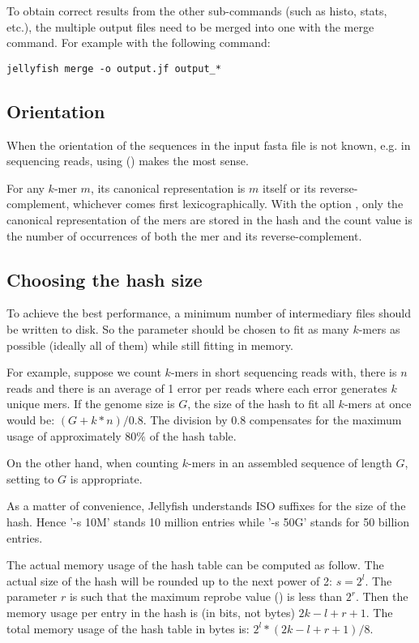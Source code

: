 \documentclass[english]{article}
\newcommand{\ddash}[1]{-\,-#1}
\newcommand{\LOpt}[1]{\Opt{\ddash{#1}}}
\begin{document}
To obtain correct results from the other sub-commands (such as histo,
stats, etc.), the multiple output files need to be merged into one
with the merge command. For example with the following command:

\begin{verbatim}
jellyfish merge -o output.jf output_*
\end{verbatim}

\subsection{Orientation}

When the orientation of the sequences in the input fasta file is not
known, e.g. in sequencing reads, using \LOpt{both-strands} ()
makes the most sense.

For any $k$-mer $m$, its canonical representation is $m$ itself or its
reverse-complement, whichever comes first lexicographically. With the
option , only the canonical representation of the mers are
stored in the hash and the count value is the number of occurrences of
both the mer and its reverse-complement.


\subsection{Choosing the hash size}

To achieve the best performance, a minimum number of intermediary
files should be written to disk. So the parameter  should be
chosen to fit as many $k$-mers as possible (ideally all of them) while
still fitting in memory.

For example, suppose we count $k$-mers in short sequencing reads with,
there is $n$ reads and there is an average of 1 error per reads where
each error generates $k$ unique mers. If the genome size is $G$, the
size of the hash to fit all $k$-mers at once would be: $(G +
k*n)/0.8$. The division by $0.8$ compensates for the maximum usage of
approximately $80\%$ of the hash table.

On the other hand, when counting $k$-mers in an assembled sequence of
length $G$, setting  to $G$ is appropriate.

As a matter of convenience, Jellyfish understands ISO suffixes for the
size of the hash. Hence '-s 10M' stands 10 million entries while '-s
50G' stands for 50 billion entries.

The actual memory usage of the hash table can be computed as
follow. The actual size of the hash will be rounded up to the next
power of 2: $s=2^l$. The parameter $r$ is such that the maximum
reprobe value () is less than $2^r$. Then the memory usage per
entry in the hash is (in bits, not bytes) $2k-l+r+1$. The total memory
usage of the hash table in bytes is: $2^l*(2k-l+r+1)/8$.
\end{document}
